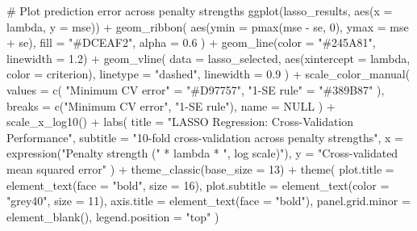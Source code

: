 \documentclass[
  letterpaper,
  DIV=11,
  numbers=noendperiod]{scrreprt}
\newenvironment{Shaded}{\begin{snugshade}}{\end{snugshade}}
\newcommand{\AttributeTok}[1]{\textcolor[rgb]{0.40,0.45,0.13}{#1}}
\newcommand{\CommentTok}[1]{\textcolor[rgb]{0.37,0.37,0.37}{#1}}
\newcommand{\ConstantTok}[1]{\textcolor[rgb]{0.56,0.35,0.01}{#1}}
\newcommand{\DecValTok}[1]{\textcolor[rgb]{0.68,0.00,0.00}{#1}}
\newcommand{\FloatTok}[1]{\textcolor[rgb]{0.68,0.00,0.00}{#1}}
\newcommand{\FunctionTok}[1]{\textcolor[rgb]{0.28,0.35,0.67}{#1}}
\newcommand{\NormalTok}[1]{\textcolor[rgb]{0.00,0.23,0.31}{#1}}
\newcommand{\OtherTok}[1]{\textcolor[rgb]{0.00,0.23,0.31}{#1}}
\newcommand{\SpecialCharTok}[1]{\textcolor[rgb]{0.37,0.37,0.37}{#1}}
\newcommand{\StringTok}[1]{\textcolor[rgb]{0.13,0.47,0.30}{#1}}
\begin{document}
\begin{Shaded}
\begin{Highlighting}[]
\CommentTok{\# Plot prediction error across penalty strengths}
\FunctionTok{ggplot}\NormalTok{(lasso\_results, }\FunctionTok{aes}\NormalTok{(}\AttributeTok{x =}\NormalTok{ lambda, }\AttributeTok{y =}\NormalTok{ mse)) }\SpecialCharTok{+}
  \FunctionTok{geom\_ribbon}\NormalTok{(}
    \FunctionTok{aes}\NormalTok{(}\AttributeTok{ymin =} \FunctionTok{pmax}\NormalTok{(mse }\SpecialCharTok{{-}}\NormalTok{ se, }\DecValTok{0}\NormalTok{), }\AttributeTok{ymax =}\NormalTok{ mse }\SpecialCharTok{+}\NormalTok{ se),}
    \AttributeTok{fill =} \StringTok{"\#DCEAF2"}\NormalTok{, }\AttributeTok{alpha =} \FloatTok{0.6}
\NormalTok{  ) }\SpecialCharTok{+}
  \FunctionTok{geom\_line}\NormalTok{(}\AttributeTok{color =} \StringTok{"\#245A81"}\NormalTok{, }\AttributeTok{linewidth =} \FloatTok{1.2}\NormalTok{) }\SpecialCharTok{+}
  \FunctionTok{geom\_vline}\NormalTok{(}
    \AttributeTok{data =}\NormalTok{ lasso\_selected,}
    \FunctionTok{aes}\NormalTok{(}\AttributeTok{xintercept =}\NormalTok{ lambda, }\AttributeTok{color =}\NormalTok{ criterion),}
    \AttributeTok{linetype =} \StringTok{"dashed"}\NormalTok{, }\AttributeTok{linewidth =} \FloatTok{0.9}
\NormalTok{  ) }\SpecialCharTok{+}
  \FunctionTok{scale\_color\_manual}\NormalTok{(}
    \AttributeTok{values =} \FunctionTok{c}\NormalTok{(}
      \StringTok{"Minimum CV error"} \OtherTok{=} \StringTok{"\#D97757"}\NormalTok{,}
      \StringTok{"1{-}SE rule"} \OtherTok{=} \StringTok{"\#389B87"}
\NormalTok{    ),}
    \AttributeTok{breaks =} \FunctionTok{c}\NormalTok{(}\StringTok{"Minimum CV error"}\NormalTok{, }\StringTok{"1{-}SE rule"}\NormalTok{),}
    \AttributeTok{name =} \ConstantTok{NULL}
\NormalTok{  ) }\SpecialCharTok{+}
  \FunctionTok{scale\_x\_log10}\NormalTok{() }\SpecialCharTok{+}
  \FunctionTok{labs}\NormalTok{(}
    \AttributeTok{title =} \StringTok{"LASSO Regression: Cross{-}Validation Performance"}\NormalTok{,}
    \AttributeTok{subtitle =} \StringTok{"10{-}fold cross{-}validation across penalty strengths"}\NormalTok{,}
    \AttributeTok{x =} \FunctionTok{expression}\NormalTok{(}\StringTok{"Penalty strength ("} \SpecialCharTok{*}\NormalTok{ lambda }\SpecialCharTok{*} \StringTok{", log scale)"}\NormalTok{),}
    \AttributeTok{y =} \StringTok{"Cross{-}validated mean squared error"}
\NormalTok{  ) }\SpecialCharTok{+}
  \FunctionTok{theme\_classic}\NormalTok{(}\AttributeTok{base\_size =} \DecValTok{13}\NormalTok{) }\SpecialCharTok{+}
  \FunctionTok{theme}\NormalTok{(}
    \AttributeTok{plot.title =} \FunctionTok{element\_text}\NormalTok{(}\AttributeTok{face =} \StringTok{"bold"}\NormalTok{, }\AttributeTok{size =} \DecValTok{16}\NormalTok{),}
    \AttributeTok{plot.subtitle =} \FunctionTok{element\_text}\NormalTok{(}\AttributeTok{color =} \StringTok{"grey40"}\NormalTok{, }\AttributeTok{size =} \DecValTok{11}\NormalTok{),}
    \AttributeTok{axis.title =} \FunctionTok{element\_text}\NormalTok{(}\AttributeTok{face =} \StringTok{"bold"}\NormalTok{),}
    \AttributeTok{panel.grid.minor =} \FunctionTok{element\_blank}\NormalTok{(),}
    \AttributeTok{legend.position =} \StringTok{"top"}
\NormalTok{  )}
\end{Highlighting}
\end{Shaded}
\end{document}

